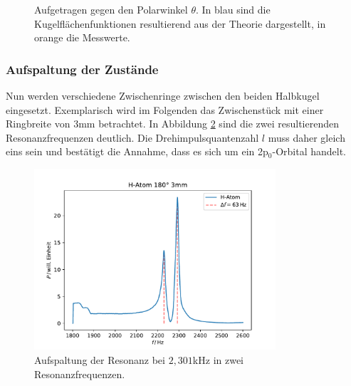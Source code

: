 \begin{figure}[H]
    \hfil
    \hfil 
    \caption{Aufgetragen gegen den Polarwinkel $\theta$. In blau sind die Kugelflächenfunktionen resultierend aus der Theorie dargestellt, in orange die Messwerte.}
    \label{figure}
\end{figure}
\subsubsection*{Aufspaltung der Zustände}
Nun werden verschiedene Zwischenringe zwischen den beiden Halbkugel eingesetzt.
Exemplarisch wird im Folgenden das Zwischenstück mit einer Ringbreite von $3$mm betrachtet. In Abbildung \ref{fig:aufspaltung} sind die zwei resultierenden Resonanzfrequenzen
deutlich. Die Drehimpulsquantenzahl $l$ muss daher gleich eins sein und bestätigt die Annahme, dass es sich um ein 2p$_0$-Orbital handelt.  

\begin{figure}[H]
    \center
    \includegraphics[width=0.8\textwidth]{plots/Hatom/zustandsaufspaltung.pdf}
    \caption{Aufspaltung der Resonanz bei $2,301$kHz in zwei Resonanzfrequenzen.}
    \label{fig:aufspaltung}
\end{figure}

